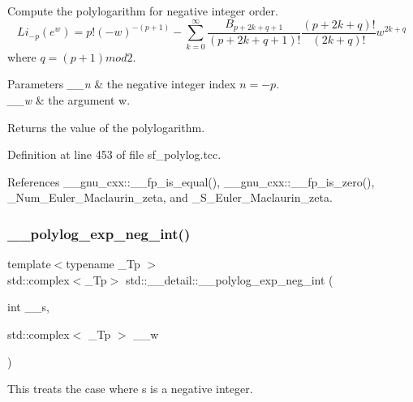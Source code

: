 Compute the polylogarithm for negative integer order. \[ Li_{-p}(e^w) = p!(-w)^{-(p+1)} - \sum_{k=0}^{\infty} \frac{B_{p+2k+q+1}}{(p+2k+q+1)!} \frac{(p+2k+q)!}{(2k+q)!}w^{2k+q} \] where $ q = (p+1) mod 2 $.


\begin{DoxyParams}{Parameters}
{\em \+\_\+\+\_\+n} & the negative integer index $ n = -p $. \\
\hline
{\em \+\_\+\+\_\+w} & the argument w. \\
\hline
\end{DoxyParams}
\begin{DoxyReturn}{Returns}
the value of the polylogarithm. 
\end{DoxyReturn}


Definition at line 453 of file sf\+\_\+polylog.\+tcc.



References \+\_\+\+\_\+gnu\+\_\+cxx\+::\+\_\+\+\_\+fp\+\_\+is\+\_\+equal(), \+\_\+\+\_\+gnu\+\_\+cxx\+::\+\_\+\+\_\+fp\+\_\+is\+\_\+zero(), \+\_\+\+Num\+\_\+\+Euler\+\_\+\+Maclaurin\+\_\+zeta, and \+\_\+\+S\+\_\+\+Euler\+\_\+\+Maclaurin\+\_\+zeta.

\mbox{\label{namespacestd_1_1____detail_a02b154619b2e4d0bf50dc303370d74cd}} 
\subsubsection{\texorpdfstring{\+\_\+\+\_\+polylog\+\_\+exp\+\_\+neg\+\_\+int()}{\_\_polylog\_exp\_neg\_int()}\hspace{0.1cm}{\footnotesize\ttfamily [1/2]}}
{\footnotesize\ttfamily template$<$typename \+\_\+\+Tp $>$ \\
std\+::complex$<$\+\_\+\+Tp$>$ std\+::\+\_\+\+\_\+detail\+::\+\_\+\+\_\+polylog\+\_\+exp\+\_\+neg\+\_\+int (\begin{DoxyParamCaption}\item[{int}]{\+\_\+\+\_\+s,  }\item[{std\+::complex$<$ \+\_\+\+Tp $>$}]{\+\_\+\+\_\+w }\end{DoxyParamCaption})}

This treats the case where s is a negative integer.


